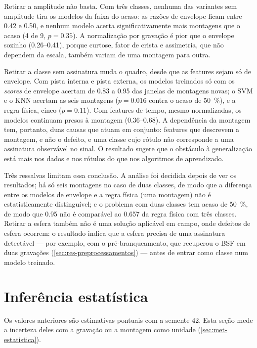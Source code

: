 Retirar a amplitude não basta. Com três classes, nenhuma das variantes sem
amplitude tira os modelos da faixa do acaso: as razões de envelope ficam entre
\num{0.42} e \num{0.50}, e nenhum modelo acerta significativamente mais montagens
que o acaso (4 de 9, $p = \num{0.35}$). A normalização por gravação é pior que o
envelope sozinho (\numrange{0.26}{0.41}), porque curtose, fator de crista e
assimetria, que não dependem da escala, também variam de uma montagem para
outra.

Retirar a classe sem assinatura muda o quadro, desde que as features sejam só de
envelope. Com pista interna e pista externa, os modelos treinados só com os
\emph{scores} de envelope acertam de \num{0.83} a \num{0.95} das janelas de
montagens novas; o SVM e o KNN acertam as seis montagens ($p = \num{0.016}$ contra
o acaso de \SI{50}{\percent}), e a regra física, cinco ($p = \num{0.11}$). Com
features de tempo, mesmo normalizadas, os modelos continuam presos à montagem
(\numrange{0.36}{0.68}). A dependência da montagem tem, portanto, duas causas que
atuam em conjunto: features que descrevem a montagem, e não o defeito, e uma
classe cujo rótulo não corresponde a uma assinatura observável no sinal. O
resultado sugere que o obstáculo à generalização está mais nos dados e nos
rótulos do que nos algoritmos de aprendizado.

Três ressalvas limitam essa conclusão. A análise foi decidida depois de ver os
resultados; há só seis montagens no caso de duas classes, de modo que a diferença
entre os modelos de envelope e a regra física (uma montagem) não é
estatisticamente distinguível; e o problema com duas classes tem acaso de
\SI{50}{\percent}, de modo que \num{0.95} não é comparável ao \num{0.657} da
regra física com três classes. Retirar a esfera também não é uma solução
aplicável em campo, onde defeitos de esfera ocorrem: o resultado indica que a
esfera precisa de uma assinatura detectável --- por exemplo, com o
pré-branqueamento, que recuperou o BSF em duas gravações
(\autoref{sec:res-preprocessamentos}) --- antes de entrar como classe num modelo treinado.

\section{Inferência estatística}
\label{sec:res-inferencia}

Os valores anteriores são estimativas pontuais com a semente 42. Esta seção mede
a incerteza deles com a gravação ou a montagem como unidade
(\autoref{sec:met-estatistica}).

